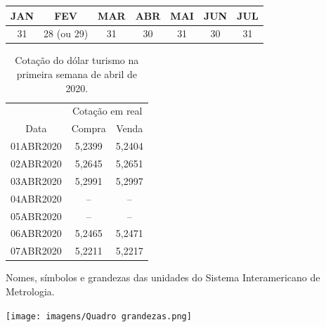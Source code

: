 \begin{enumerate}[label=\alph*)]
\begin{table}[!ht]
{		    %
		    \begin{adjustbox}{width=0.7\textwidth,center}
			\begin{tabular}{ccccccc}
		    	\toprule
				JAN & FEV & MAR & ABR & MAI & JUN & JUL \\
				\midrule 
				31 & 28 (ou 29) & 31 & 30 & 31 & 30 & 31\\
				\bottomrule
			\end{tabular}
			\end{adjustbox}
		}{
		}
		\label{tab:exemplo-1}
\end{table}


\begin{table}[h]
\centering
\caption{Cotação do dólar turismo na primeira semana de abril de 2020.}
\label{tab:my-table}
\begin{adjustbox}{width=0.4\textwidth,center}
\begin{tabular}{@{}ccc@{}}
\toprule
          & \multicolumn{2}{c}{Cotação em real} \\ \cmidrule(l){2-3} 
Data      & Compra           & Venda            \\
01ABR2020 & 5,2399           & 5,2404           \\
02ABR2020 & 5,2645           & 5,2651           \\
03ABR2020 & 5,2991           & 5,2997           \\
04ABR2020 & --               & --               \\
05ABR2020 & --               & --               \\
06ABR2020 & 5,2465           & 5,2471           \\
07ABR2020 & 5,2211           & 5,2217           \\ \bottomrule
\end{tabular}
\end{adjustbox}
\end{table}

    \begin{quadro}[h!]
        \caption{Nomes, símbolos e grandezas das unidades do Sistema Interamericano de Metrologia.}
        \centering
		\texttt{[image: imagens/Quadro grandezas.png]}
	    \label{qd:grandezas}
    \end{quadro}
    
    

\end{enumerate}
